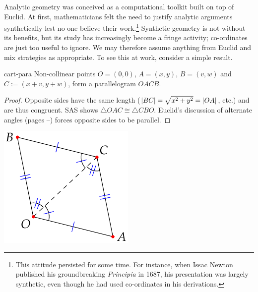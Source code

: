 Analytic geometry was conceived as a computational toolkit built on top of Euclid. At first, mathematicians felt the need to justify analytic arguments synthetically lest no-one believe their work.\footnote{This attitude persisted for some time. For instance, when Issac Newton published his groundbreaking \emph{Principia} in 1687, his presentation was largely synthetic, even though he had used co-ordinates in his derivations.} Synthetic geometry is not without its benefits, but its study has increasingly become a fringe activity; co-ordinates are just too useful to ignore.\smallbreak
We may therefore assume anything from Euclid and mix strategies as appropriate. To see this at work, consider a simple result.

\begin{minipage}[t]{0.74\linewidth}\vspace{0pt}
	\begin{lemm}{}{cart-para}
		Non-collinear points $O=(0,0)$, $A=(x,y)$, $B=(v,w)$ and $C:=(x+v,y+w)$, form a parallelogram $OACB$.
	\end{lemm}
	
	\begin{proof}
		Opposite sides have the same length ($\left| BC\right|=\sqrt{x^2+y^2}=\left| OA\right|$, etc.) and are thus congruent. SAS shows $\triangle OAC\cong \triangle CBO$. Euclid's discussion of alternate angles (pages \pageref{defn:parallel}--\pageref*{axiom:playfair}) forces opposite sides to be parallel.
	\end{proof}
\end{minipage}
\hfill
\begin{minipage}[t]{0.25\linewidth}\vspace{0pt}
	\flushright\includegraphics[scale=0.9]{analytic-para}
\end{minipage}

\goodbreak


\iffalse
{}


